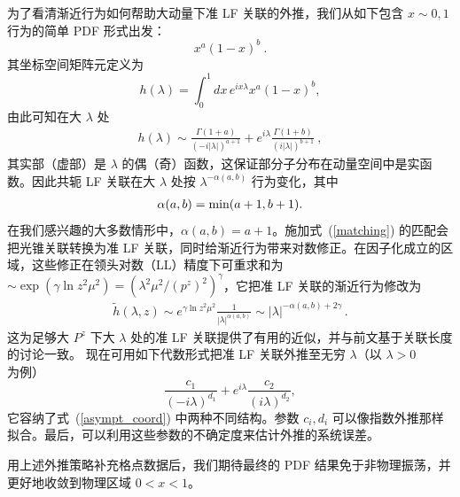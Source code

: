 为了看清渐近行为如何帮助大动量下准 LF 关联的外推，我们从如下包含 $x\sim 0, 1$ 行为的简单 PDF 形式出发：
\begin{equation}
     x^a (1-x)^b \ .
\end{equation}
其坐标空间矩阵元定义为
\begin{equation}
h(\lambda)=\int_0^1 dx \, e^{i x\lambda}x^a (1-x)^b,
\end{equation}
由此可知在大 $\lambda$ 处
\begin{align}\label{asympt_coord}
h(\lambda)\sim\frac{\Gamma(1+a)}{(-i|\lambda|)^{a+1}}+e^{i\lambda}\frac{\Gamma(1+b)}{(i|\lambda|)^{b+1}} \ ,
\end{align}
其实部（虚部）是 $\lambda$ 的偶（奇）函数，这保证部分子分布在动量空间中是实函数。因此共轭 LF 关联在大 $\lambda$ 处按 $\lambda^{-\alpha(a,b)}$ 行为变化，其中
\begin{align}
\alpha(a,b)=\text{\rm min}(a+1,b+1).
\end{align}
在我们感兴趣的大多数情形中，$\alpha(a,b)=a+1$。施加式~(\ref{matching}) 的匹配会把光锥关联转换为准 LF 关联，同时给渐近行为带来对数修正。在因子化成立的区域，这些修正在领头对数（LL）精度下可重求和为 $\sim \exp(\gamma \ln z^2\mu^2)=(\lambda^2\mu^2/(p^z)^2)^\gamma$，它把准 LF 关联的渐近行为修改为
\begin{align}\label{asymphtilde}
\tilde h(\lambda,z)\sim e^{\gamma \ln z^2\mu^2}\frac{1}{|\lambda|^{\alpha(a,b)}}\sim |\lambda|^{-\alpha(a,b)+2\gamma }  \,.
\end{align}
这为足够大 $P^z$ 下大 $\lambda$ 处的准 LF 关联提供了有用的近似，并与前文基于关联长度的讨论一致。
现在可用如下代数形式把准 LF 关联外推至无穷 $\lambda$（以 $\lambda>0$ 为例）
\begin{equation}\label{extrap}
\frac{c_1}{(-i \lambda)^{d_1}}+e^{i\lambda}\frac{c_2}{(i \lambda)^{d_2}},
\end{equation}
它容纳了式~(\ref{asympt_coord}) 中两种不同结构。参数 $c_i, d_i$ 可以像指数外推那样拟合。最后，可以利用这些参数的不确定度来估计外推的系统误差。





用上述外推策略补充格点数据后，我们期待最终的 PDF 结果免于非物理振荡，并更好地收敛到物理区域 $0<x<1$。
